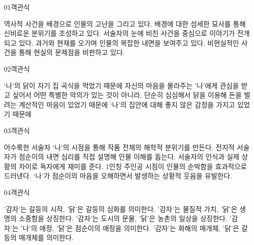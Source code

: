 \documentclass[fs9,seriesRus]{korfarm-base}
\begin{document}

\par\medskip
\kfBeginMC
\begin{kfQBlock}{01}{객관식}
\begin{kfChoices}
\kfChoice 역사적 사건을 배경으로 인물의 고난을 그리고 있다.
\kfChoice 배경에 대한 섬세한 묘사를 통해 신비로운 분위기를 조성하고 있다.
\kfChoice 서술자의 눈에 비친 사건을 중심으로 이야기가 전개되고 있다.
\kfChoice 과거와 현재를 오가며 인물의 복잡한 내면을 보여주고 있다.
\kfChoice 비현실적인 사건을 통해 현실의 문제점을 비판하고 있다.
\end{kfChoices}
\end{kfQBlock}
\begin{kfQBlock}{02}{객관식}
\begin{kfChoices}
\kfChoice ‘나’의 닭이 자기 집 곡식을 먹었기 때문에
\kfChoice 자신의 마음을 몰라주는 '나'에게 관심을 받고 싶어서
\kfChoice 어떤 특별한 악의가 있는 것이 아니라, 단순히 심심해서
\kfChoice 닭을 이용해 돈을 벌려는 계산적인 마음이 있었기 때문에
\kfChoice ‘나’의 집안에 대해 좋지 않은 감정을 가지고 있었기 때문에
\end{kfChoices}
\end{kfQBlock}
\begin{kfQBlock}{03}{객관식}
\begin{kfChoices}
\kfChoice 어수룩한 서술자 ‘나’의 시점을 통해 작품 전체의 해학적 분위기를 만든다.
\kfChoice 전지적 서술자가 점순이의 내면 심리를 직접 설명해 인물 이해를 돕는다.
\kfChoice 서술자의 인식과 실제 상황의 차이로 독자에게 재미를 준다.
\kfChoice 1인칭 주인공 시점이 인물의 순박함을 효과적으로 드러낸다.
\kfChoice ‘나’가 점순이의 마음을 오해하면서 발생하는 상황적 웃음을 유발한다.
\end{kfChoices}
\end{kfQBlock}
\begin{kfQBlock}{04}{객관식}
\begin{kfChoices}
\kfChoice '감자'는 갈등의 시작, '닭'은 갈등의 심화를 의미한다.
\kfChoice '감자'는 물질적 가치, '닭'은 생명의 소중함을 상징한다.
\kfChoice '감자'는 도시의 문물, '닭'은 농촌의 일상을 상징한다.
\kfChoice '감자'는 '나'의 애정, '닭'은 점순이의 애정을 의미한다.
\kfChoice '감자'는 화해의 매개체, '닭'은 갈등의 매개체를 의미한다.
\end{kfChoices}
\end{kfQBlock}
\end{document}
